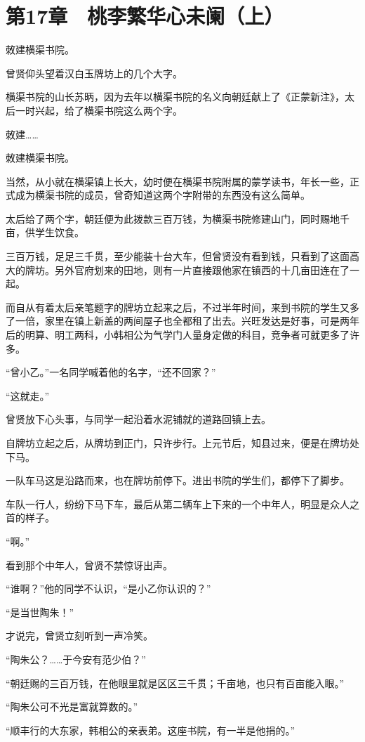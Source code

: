 \section{第17章　桃李繁华心未阑（上）}

敇建横渠书院。

曾贤仰头望着汉白玉牌坊上的几个大字。

横渠书院的山长苏昞，因为去年以横渠书院的名义向朝廷献上了《正蒙新注》，太后一时兴起，给了横渠书院这么两个字。

敇建……

敇建横渠书院。

当然，从小就在横渠镇上长大，幼时便在横渠书院附属的蒙学读书，年长一些，正式成为横渠书院的成员，曾奇知道这两个字附带的东西没有这么简单。

太后给了两个字，朝廷便为此拨款三百万钱，为横渠书院修建山门，同时赐地千亩，供学生饮食。

三百万钱，足足三千贯，至少能装十台大车，但曾贤没有看到钱，只看到了这面高大的牌坊。另外官府划来的田地，则有一片直接跟他家在镇西的十几亩田连在了一起。

而自从有着太后亲笔题字的牌坊立起来之后，不过半年时间，来到书院的学生又多了一倍，家里在镇上新盖的两间屋子也全都租了出去。兴旺发达是好事，可是两年后的明算、明工两科，小韩相公为气学门人量身定做的科目，竞争者可就更多了许多。

“曾小乙。”一名同学喊着他的名字，“还不回家？”

“这就走。”

曾贤放下心头事，与同学一起沿着水泥铺就的道路回镇上去。

自牌坊立起之后，从牌坊到正门，只许步行。上元节后，知县过来，便是在牌坊处下马。

一队车马这是沿路而来，也在牌坊前停下。进出书院的学生们，都停下了脚步。

车队一行人，纷纷下马下车，最后从第二辆车上下来的一个中年人，明显是众人之首的样子。

“啊。”

看到那个中年人，曾贤不禁惊讶出声。

“谁啊？”他的同学不认识，“是小乙你认识的？”

“是当世陶朱！”

才说完，曾贤立刻听到一声冷笑。

“陶朱公？……于今安有范少伯？”

“朝廷赐的三百万钱，在他眼里就是区区三千贯；千亩地，也只有百亩能入眼。”

“陶朱公可不光是富就算数的。”

“顺丰行的大东家，韩相公的亲表弟。这座书院，有一半是他捐的。”

